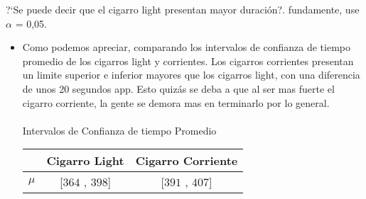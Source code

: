 ?`Se puede decir que el cigarro light presentan mayor duraci\'on?. fundamente, use $\alpha$ = 0,05.
	\begin{itemize}
		\item Como podemos apreciar, comparando los intervalos de confianza de tiempo promedio de los cigarros light y corrientes. Los cigarros corrientes presentan un limite superior e inferior mayores que los cigarros light, con una diferencia de unos 20 segundos app. Esto quiz\'as se deba a que al ser mas fuerte el cigarro corriente, la gente se demora mas en terminarlo por lo general.\\\\
	Intervalos de Confianza de tiempo Promedio\\
        \begin{tabular}{|c|c|c|}\hline

         & Cigarro Light & Cigarro Corriente\\\hline
        $\mu$ & [$364$ , $398$] & [$391$ , $407$] \\\hline
        \end{tabular}

	
	\end{itemize}
